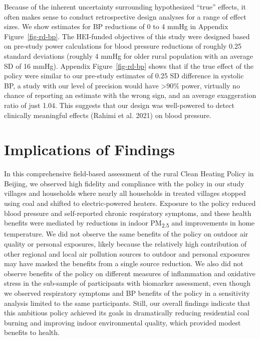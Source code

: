 \documentclass[
  letterpaper,
  DIV=11,
  numbers=noendperiod]{scrartcl}
\begin{document}
Because of the inherent uncertainty surrounding hypothesized ``true''
effects, it often makes sense to conduct retrospective design analyses
for a range of effect sizes. We show estimates for BP reductions of 0 to
4 mmHg in Appendix Figure~\ref{fig-rd-bp}. The HEI-funded objectives of
this study were designed based on pre-study power calculations for blood
pressure reductions of roughly 0.25 standard deviations (roughly 4 mmHg
for older rural population with an average SD of 16 mmHg). Appendix
Figure~\ref{fig-rd-bp} shows that if the true effect of the policy were
similar to our pre-study estimates of 0.25 SD difference in systolic BP,
a study with our level of precision would have \textgreater90\% power,
virtually no chance of reporting an estimate with the wrong sign, and an
average exaggeration ratio of just 1.04. This suggests that our design
was well-powered to detect clinically meaningful effects (Rahimi et al.
2021) on blood pressure.

\section{Implications of Findings}\label{implications-of-findings}

In this comprehensive field-based assessment of the rural Clean Heating
Policy in Beijing, we observed high fidelity and compliance with the
policy in our study villages and households where nearly all households
in treated villages stopped using coal and shifted to electric-powered
heaters. Exposure to the policy reduced blood pressure and self-reported
chronic respiratory symptoms, and these health benefits were mediated by
reductions in indoor PM\textsubscript{2.5} and improvements in home
temperature. We did not observe the same benefits of the policy on
outdoor air quality or personal exposures, likely because the relatively
high contribution of other regional and local air pollution sources to
outdoor and personal exposures may have masked the benefits from a
single source reduction. We also did not observe benefits of the policy
on different measures of inflammation and oxidative stress in the
sub-sample of participants with biomarker assessment, even though we
observed respiratory symptoms and BP benefits of the policy in a
sensitivity analysis limited to the same participants. Still,
 our overall findings indicate that this ambitious policy
achieved its goals in dramatically reducing residential coal burning and
improving indoor environmental quality, which provided modest benefits
to health.
\end{document}
